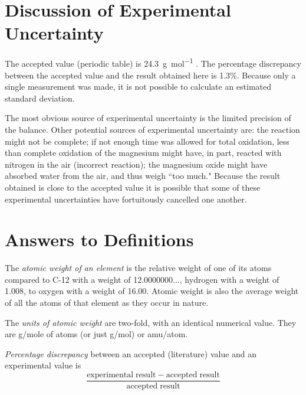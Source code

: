 \documentclass{article}
\begin{document}
\section{Discussion of Experimental Uncertainty}

The accepted value (periodic table) is \SI{24.3}{\gram\per\mole} \cite{Smith:2012qr}. The percentage discrepancy between the accepted value and the result obtained here is 1.3\%. Because only a single measurement was made, it is not possible to calculate an estimated standard deviation.

The most obvious source of experimental uncertainty is the limited precision of the balance. Other potential sources of experimental uncertainty are: the reaction might not be complete; if not enough time was allowed for total oxidation, less than complete oxidation of the magnesium might have, in part, reacted with nitrogen in the air (incorrect reaction); the magnesium oxide might have absorbed water from the air, and thus weigh ``too much." Because the result obtained is close to the accepted value it is possible that some of these experimental uncertainties have fortuitously cancelled one another.


\section{Answers to Definitions}

\begin{enumerate}
\begin{item}
The \emph{atomic weight of an element} is the relative weight of one of its atoms compared to C-12 with a weight of 12.0000000$\ldots$, hydrogen with a weight of 1.008, to oxygen with a weight of 16.00. Atomic weight is also the average weight of all the atoms of that element as they occur in nature.
\end{item}
\begin{item}
The \emph{units of atomic weight} are two-fold, with an identical numerical value. They are g/mole of atoms (or just g/mol) or amu/atom.
\end{item}
\begin{item}
\emph{Percentage discrepancy} between an accepted (literature) value and an experimental value is
\begin{equation*}
\frac{\mathrm{experimental\;result} - \mathrm{accepted\;result}}{\mathrm{accepted\;result}}
\end{equation*}
\end{item}
\end{enumerate}






\end{document}
